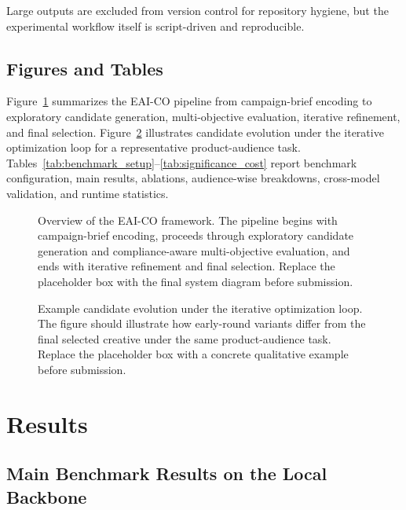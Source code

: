 \documentclass[preprint,12pt]{elsarticle}
\begin{document}
Large outputs are excluded from version control for repository hygiene, but the experimental workflow itself is script-driven and reproducible.

\subsection{Figures and Tables}

Figure~\ref{fig:eai_co_pipeline} summarizes the EAI-CO pipeline from campaign-brief encoding to exploratory candidate generation, multi-objective evaluation, iterative refinement, and final selection. Figure~\ref{fig:candidate_evolution} illustrates candidate evolution under the iterative optimization loop for a representative product-audience task. Tables~\ref{tab:benchmark_setup}--\ref{tab:significance_cost} report benchmark configuration, main results, ablations, audience-wise breakdowns, cross-model validation, and runtime statistics.

\begin{figure}[t]
\centering
\fbox{\rule{0pt}{2.1in}\rule{0.92\textwidth}{0pt}}
\caption{Overview of the EAI-CO framework. The pipeline begins with campaign-brief encoding, proceeds through exploratory candidate generation and compliance-aware multi-objective evaluation, and ends with iterative refinement and final selection. Replace the placeholder box with the final system diagram before submission.}
\label{fig:eai_co_pipeline}
\end{figure}

\begin{figure}[t]
\centering
\fbox{\rule{0pt}{2.1in}\rule{0.92\textwidth}{0pt}}
\caption{Example candidate evolution under the iterative optimization loop. The figure should illustrate how early-round variants differ from the final selected creative under the same product-audience task. Replace the placeholder box with a concrete qualitative example before submission.}
\label{fig:candidate_evolution}
\end{figure}



\section{Results}

\subsection{Main Benchmark Results on the Local Backbone}
\end{document}
